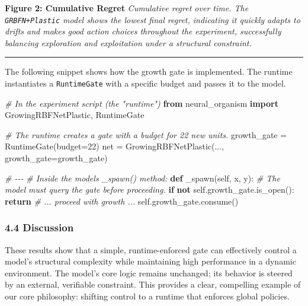 \documentclass[
]{article}
\newenvironment{Shaded}{}{}
\newcommand{\CommentTok}[1]{\textcolor[rgb]{0.38,0.63,0.69}{\textit{#1}}}
\newcommand{\ControlFlowTok}[1]{\textcolor[rgb]{0.00,0.44,0.13}{\textbf{#1}}}
\newcommand{\DecValTok}[1]{\textcolor[rgb]{0.25,0.63,0.44}{#1}}
\newcommand{\ImportTok}[1]{\textcolor[rgb]{0.00,0.50,0.00}{\textbf{#1}}}
\newcommand{\KeywordTok}[1]{\textcolor[rgb]{0.00,0.44,0.13}{\textbf{#1}}}
\newcommand{\NormalTok}[1]{#1}
\newcommand{\OperatorTok}[1]{\textcolor[rgb]{0.40,0.40,0.40}{#1}}
\newcommand{\VariableTok}[1]{\textcolor[rgb]{0.10,0.09,0.49}{#1}}
\begin{document}
\textbf{Figure 2: Cumulative Regret}
\emph{
Cumulative regret over time. The \texttt{GRBFN+Plastic} model shows the
lowest final regret, indicating it quickly adapts to drifts and makes
good action choices throughout the experiment, successfully balancing
exploration and exploitation under a structural constraint.}

\begin{center}\rule{0.5\linewidth}{0.5pt}\end{center}

The following snippet shows how the growth gate is implemented. The
runtime instantiates a \texttt{RuntimeGate} with a specific budget and
passes it to the model.

\begin{Shaded}
\begin{Highlighting}[]
\CommentTok{\# In the experiment script (the "runtime")}
\ImportTok{from}\NormalTok{ neural_organism }\ImportTok{import}\NormalTok{ GrowingRBFNetPlastic, RuntimeGate}

\CommentTok{\# The runtime creates a gate with a budget for 22 new units.}
\NormalTok{growth\_gate }\OperatorTok{=}\NormalTok{ RuntimeGate(budget}\OperatorTok{=}\DecValTok{22}\NormalTok{)}
\NormalTok{net }\OperatorTok{=}\NormalTok{ GrowingRBFNetPlastic(..., growth\_gate}\OperatorTok{=}\NormalTok{growth\_gate)}

\CommentTok{\# {-}{-}{-}}
\CommentTok{\# Inside the model\textquotesingle{}s \_spawn() method:}
\KeywordTok{def}\NormalTok{ \_spawn(}\VariableTok{self}\NormalTok{, x, y):}
    \CommentTok{\# The model must query the gate before proceeding.}
    \ControlFlowTok{if} \KeywordTok{not} \VariableTok{self}\NormalTok{.growth\_gate.is\_open():}
        \ControlFlowTok{return}
    \CommentTok{\# ... proceed with growth ...}
    \VariableTok{self}\NormalTok{.growth\_gate.consume()}
\end{Highlighting}
\end{Shaded}

\hypertarget{discussion}{%
\subsubsection{4.4 Discussion}\label{discussion}}

These results show that a simple, runtime-enforced gate can effectively
control a model's structural complexity while maintaining high
performance in a dynamic environment. The model's core logic remains
unchanged; its behavior is steered by an external, verifiable
constraint. This provides a clear, compelling example of our core
philosophy: shifting control to a runtime that enforces global policies.
\end{document}
